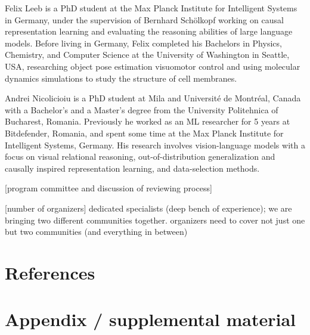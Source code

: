 \documentclass{article}
\begin{document}
Felix Leeb is a PhD student at the Max Planck Institute for Intelligent Systems in Germany, under the supervision of Bernhard Schölkopf working on causal representation learning and evaluating the reasoning abilities of large language models. Before living in Germany, Felix completed his Bachelors in Physics, Chemistry, and Computer Science at the University of Washington in Seattle, USA, researching object pose estimation visuomotor control and using molecular dynamics simulations to study the structure of cell membranes.

Andrei Nicolicioiu is a PhD student at Mila and Université de Montréal, Canada with a Bachelor’s and a Master’s degree from the University Politehnica of Bucharest, Romania. Previously he worked as an ML researcher for 5 years at Bitdefender, Romania, and spent some time at the Max Planck Institute for Intelligent Systems, Germany. His research involves vision-language models with a focus on visual relational reasoning, out-of-distribution generalization and causally inspired representation learning, and data-selection methods.

[program committee and discussion of reviewing process]

[number of organizers] dedicated specialists (deep bench of experience); we are bringing two different communities together. organizers need to cover not just one but two communities (and everything in between)

\section{References}




\newpage

\appendix

\section{Appendix / supplemental material}



\end{document}
